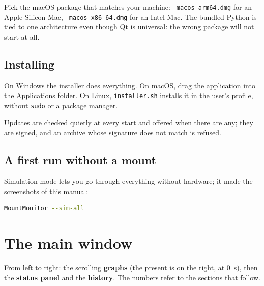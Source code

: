 \begin{warning}
Pick the macOS package that matches your machine: \texttt{-macos-arm64.dmg}
for an Apple Silicon Mac, \texttt{-macos-x86\_64.dmg} for an Intel Mac. The
bundled Python is tied to one architecture even though Qt is universal: the
wrong package will not start at all.
\end{warning}

\section{Installing}

On Windows the installer does everything. On macOS, drag the application into
the Applications folder. On Linux, \texttt{installer.sh} installs it in the
user's profile, without \texttt{sudo} or a package manager.

Updates are checked quietly at every start and offered when there are any;
they are signed, and an archive whose signature does not match is refused.

\section{A first run without a mount}

Simulation mode lets you go through everything without hardware; it made the
screenshots of this manual:

\begin{lstlisting}[language=bash]
MountMonitor --sim-all
\end{lstlisting}

\chapter{The main window}
\label{ch:window}


From left to right: the scrolling \textbf{graphs} (the present is on the
right, at 0~s), then the \textbf{status panel} and the \textbf{history}.
The numbers refer to the sections that follow.

